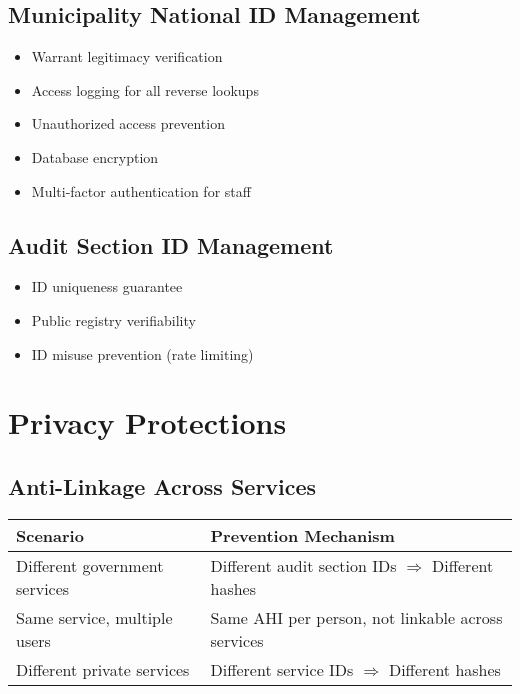\subsection{Municipality National ID Management}

\begin{itemize}
  \item Warrant legitimacy verification
  \item Access logging for all reverse lookups
  \item Unauthorized access prevention
  \item Database encryption
  \item Multi-factor authentication for staff
\end{itemize}

\subsection{Audit Section ID Management}

\begin{itemize}
  \item ID uniqueness guarantee
  \item Public registry verifiability
  \item ID misuse prevention (rate limiting)
\end{itemize}

\section{Privacy Protections}

\subsection{Anti-Linkage Across Services}

\begin{table}[h]
\centering
\begin{tabular}{|l|l|}
\hline
\textbf{Scenario} & \textbf{Prevention Mechanism} \\
\hline
Different government services & Different audit section IDs $\Rightarrow$ Different hashes \\
Same service, multiple users & Same AHI per person, not linkable across services \\
Different private services & Different service IDs $\Rightarrow$ Different hashes \\
\hline
\end{tabular}
\end{table}

